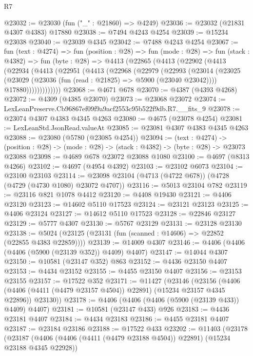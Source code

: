 \begin{lexlean}{R7}
\begin{coremodule}
@23032 := @23030 (fun ("_" : @21860) => @4249)
@23036 := @23032 (@21831 @4307 @4383) @17880
@23038 := @7494 @4243 @4254
@23039 := @15234 @23038
@23040 := @23039 @4345
@23042 := @7488 @4243 @4254
@23067 := fun (text : @4274) =>
  fun (position : @28) =>
  fun (mode : @28) =>
  fun (stack : @4382) =>
  fun (byte : @28) =>
  @4413
    (@22865
      (@4413
        (@22902
          (@4413
            (@22934
              (@4413
                (@22951
                  (@4413
                    (@22968
                      (@22979
                        (@22993
                          (@23014
                            (@23025
                              (@23029 (@23036 (fun (read : @21825) => @5900 (@23040 @23042))))
                              @17880)))))))))))))
@23068 := @4671 @678
@23070 := @4387 (@4393 @4268)
@23072 := @4309 (@4385 @23070)
@23073 := @23068 @23072
@23074 := LexLeanPreserve.Cb96867ef09f9a9acf2553c95b522f9db.R7.__fits_9
@23078 := @23074 @4307 @4383 @4345 @4263
@23080 := @4675 (@23078 @4254)
@23081 := LexLeanStd.JsonRead.valueAt
@23085 := @23081 @4307 @4383 @4345 @4263
@23088 := @23080 (@5780 (@23085 @4254))
@23094 := (text : @4274) ->
  (position : @28) -> (mode : @28) -> (stack : @4382) -> (byte : @28) -> @23073 @23088
@23098 := @4689 @678 @23072 @23088 @1080
@23100 := @4697 (@8313 @4266)
@23102 := @4697 (@4954 @4392)
@23103 := @23102 @6073
@23104 := @23100 @23103
@23114 := @23098 @23104 (@4713 (@4722 @678)) (@4728 (@4729 (@4730 @1080) @23072 @4707))
@23116 := @5013 @23104 @782
@23119 := @23116 @821 @1078 @4412
@23120 := @4408 @19430
@23121 := @4406 @23120
@23123 := @14602 @5110 @17523
@23124 := @23121 @23123
@23125 := @4406 @23124
@23127 := @14612 @5110 @17523
@23128 := @22846 @23127
@23129 := @5777 @4307
@23130 := @5767 @23129
@23131 := @23128 @23130
@23138 := @5024 (@23125 (@23131 (fun (scanned : @14606) => @22852 (@22855 @4383 @22859))))
@23139 := @14009 @4307
@23146 := @4406 (@4406 (@4406 (@5900 (@23139 @352)) @4409) @4407)
@23147 := @14044 @4307
@23150 := @10581 (@23147 @352) @863
@23152 := @4436 @23150 @4407
@23153 := @4434 @23152
@23155 := @4455 @23150 @4407
@23156 := @23153 @23155
@23157 := @17522 @352
@23171 := @11427
    (@23146
      (@23156
        (@4406 (@4406 (@4411 (@4479 @23157 @4504)) @22891) (@15234 @23157 @4345 @22896))
        @23130))
@23178 := @4406 (@4406 (@4406 (@5900 (@23139 @433)) @4409) @4407)
@23181 := @10581 (@23147 @433) @926
@23183 := @4436 @23181 @4407
@23184 := @4434 @23183
@23186 := @4455 @23181 @4407
@23187 := @23184 @23186
@23188 := @17522 @433
@23202 := @11403
    (@23178
      (@23187
        (@4406 (@4406 (@4411 (@4479 @23188 @4504)) @22891) (@15234 @23188 @4345 @22928))

\end{coremodule}
\end{lexlean}
